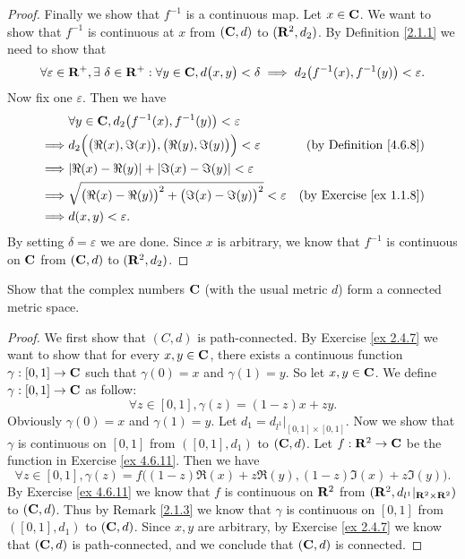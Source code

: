 \begin{proof}
    Finally we show that \(f^{-1}\) is a continuous map.
    Let \(x \in \mathbf{C}\).
    We want to show that \(f^{-1}\) is continuous at \(x\) from \((\mathbf{C}, d)\) to \((\mathbf{R}^2, d_2)\).
    By Definition \ref{2.1.1} we need to show that
    \[
        \forall \varepsilon \in \mathbf{R}^+, \exists\ \delta \in \mathbf{R}^+ : \forall y \in \mathbf{C}, d\big(x, y\big) < \delta \implies d_2\big(f^{-1}(x), f^{-1}(y)\big) < \varepsilon.
    \]
    Now fix one \(\varepsilon\).
    Then we have
    \begin{align*}
                 & \forall y \in \C, d_2\big(f^{-1}(x), f^{-1}(y)\big) < \varepsilon                                                    \\
        \implies & d_2\Big(\big(\Re(x), \Im(x)\big), \big(\Re(y), \Im(y)\big)\Big) < \varepsilon  & \text{(by Definition \ref{4.6.8})}  \\
        \implies & \abs{\Re(x) - \Re(y)} + \abs{\Im(x) - \Im(y)} < \varepsilon                                                          \\
        \implies & \sqrt{\big(\Re(x) - \Re(y)\big)^2 + \big(\Im(x) - \Im(y)\big)^2} < \varepsilon & \text{(by Exercise \ref{ex 1.1.8})} \\
        \implies & d(x, y) < \varepsilon.
    \end{align*}
    By setting \(\delta = \varepsilon\) we are done.
    Since \(x\) is arbitrary, we know that \(f^{-1}\) is continuous on \(\mathbf{C}\) from \((\mathbf{C}, d)\) to \((\mathbf{R}^2, d_2)\).
\end{proof}

\begin{exercise}\label{ex 4.6.12}
    Show that the complex numbers \(\mathbf{C}\) (with the usual metric \(d\)) form a connected metric space.
\end{exercise}

\begin{proof}
    We first show that \((C, d)\) is path-connected.
    By Exercise \ref{ex 2.4.7} we want to show that for every \(x, y \in \mathbf{C}\), there exists a continuous function \(\gamma : [0, 1] \to \mathbf{C}\) such that \(\gamma(0) = x\) and \(\gamma(1) = y\).
    So let \(x, y \in \mathbf{C}\).
    We define \(\gamma : [0, 1] \to \mathbf{C}\) as follow:
    \[
        \forall z \in [0, 1], \gamma(z) = (1 - z)x + zy.
    \]
    Obviously \(\gamma(0) = x\) and \(\gamma(1) = y\).
    Let \(d_1 = d_{l^1}|_{[0, 1] \times [0, 1]}\).
    Now we show that \(\gamma\) is continuous on \([0, 1]\) from \(([0, 1], d_1)\) to \((\mathbf{C}, d)\).
    Let \(f : \mathbf{R}^2 \to \mathbf{C}\) be the function in Exercise \ref{ex 4.6.11}.
    Then we have
    \[
        \forall z \in [0, 1], \gamma(z) = f\big((1 - z) \Re(x) + z \Re(y), (1 - z) \Im(x) + z \Im(y)\big).
    \]
    By Exercise \ref{ex 4.6.11} we know that \(f\) is continuous on \(\mathbf{R}^2\) from \((\mathbf{R}^2, d_{l^1}|_{\mathbf{R}^2 \times \mathbf{R}^2})\) to \((\mathbf{C}, d)\).
    Thus by Remark \ref{2.1.3} we know that \(\gamma\) is continuous on \([0, 1]\) from \(([0, 1], d_1)\) to \((\mathbf{C}, d)\).
    Since \(x, y\) are arbitrary, by Exercise \ref{ex 2.4.7} we know that \((\mathbf{C}, d)\) is path-connected, and we conclude that \((\mathbf{C}, d)\) is connected.
\end{proof}

